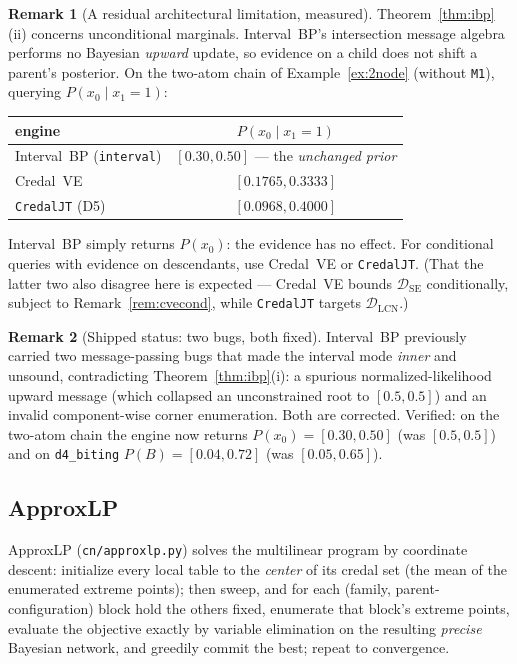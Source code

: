\documentclass[11pt]{article}
\theoremstyle{definition}
\newtheorem{remark}{Remark}
\newcommand{\DSE}{\mathcal{D}_{\mathrm{SE}}}
\newcommand{\DLCN}{\mathcal{D}_{\mathrm{LCN}}}
\begin{document}
\begin{remark}[A residual architectural limitation, measured]\label{rem:ibpevid}
Theorem~\ref{thm:ibp}(ii) concerns unconditional marginals. Interval~BP's intersection message algebra
performs no Bayesian \emph{upward} update, so evidence on a child does not shift a parent's posterior.
On the two-atom chain of Example~\ref{ex:2node} (without \texttt{M1}), querying $P(x_0\mid x_1{=}1)$:
\begin{center}\small
\begin{tabular}{@{}lc@{}}
\toprule
engine & $P(x_0\mid x_1{=}1)$\\
\midrule
Interval~BP (\texttt{interval}) & $[0.30,0.50]$ --- the \emph{unchanged prior}\\
Credal~VE & $[0.1765,0.3333]$\\
\texttt{CredalJT} (D5) & $[0.0968,0.4000]$\\
\bottomrule
\end{tabular}
\end{center}
Interval~BP simply returns $P(x_0)$: the evidence has no effect. For conditional queries with
evidence on descendants, use Credal~VE or \texttt{CredalJT}. (That the latter two also disagree here
is expected --- Credal~VE bounds $\DSE$ conditionally, subject to Remark~\ref{rem:cvecond}, while
\texttt{CredalJT} targets $\DLCN$.)
\end{remark}

\begin{remark}[Shipped status: two bugs, both fixed]\label{rem:ibpbugs}
Interval~BP previously carried two message-passing bugs that made the interval mode \emph{inner} and
unsound, contradicting Theorem~\ref{thm:ibp}(i): a spurious normalized-likelihood upward message
(which collapsed an unconstrained root to $[0.5,0.5]$) and an invalid component-wise corner
enumeration. Both are corrected. Verified: on the two-atom chain the engine now returns
$P(x_0)=[0.30,0.50]$ (was $[0.5,0.5]$) and on \texttt{d4\_biting} $P(B)=[0.04,0.72]$ (was
$[0.05,0.65]$).
\end{remark}

\subsection{ApproxLP}\label{sec:approxlp}
ApproxLP (\texttt{cn/approxlp.py}) solves the multilinear program by coordinate descent: initialize
every local table to the \emph{center} of its credal set (the mean of the enumerated extreme points);
then sweep, and for each (family, parent-configuration) block hold the others fixed, enumerate that
block's extreme points, evaluate the objective exactly by variable elimination on the resulting
\emph{precise} Bayesian network, and greedily commit the best; repeat to convergence.
\end{document}
